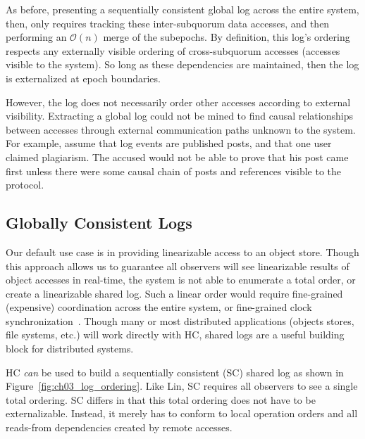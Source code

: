 As before, presenting a sequentially consistent global log across the entire system, then, only requires tracking these inter-subquorum data accesses, and then performing an $\mathcal{O}(n)$ merge of the subepochs.
By definition, this log's ordering respects any externally visible ordering of cross-subquorum accesses (accesses visible to the system).
So long as these dependencies are maintained, then the log is externalized at epoch boundaries.

However, the log does not necessarily order other accesses according to external visibility.
Extracting a global log could not be mined to find causal relationships between accesses through external communication paths unknown to the system.
For example, assume that log events are published posts, and that one user claimed plagiarism.
The accused would not be able to prove that his post came first unless there were some causal chain of posts and references visible to the protocol.

\subsection{Globally Consistent Logs}
\label{sec:ch03_log_ordering}

Our default use case is in providing linearizable access to an object store.
Though this approach allows us to guarantee all observers will see linearizable results of object accesses in real-time, the system is not able to enumerate a total order, or create a linearizable shared log.
Such a linear order would require fine-grained (expensive) coordination across the entire system, or fine-grained clock synchronization~\cite{spanner}.
Though many or most distributed applications (objects stores, file systems, etc.) will work directly with HC, shared logs are a useful building block for distributed systems.

HC \emph{can} be used to build a sequentially consistent (SC) shared log as shown in Figure~\ref{fig:ch03_log_ordering}.
Like Lin, SC requires all observers to see a single total ordering.
SC differs in that this total ordering does not have to be externalizable.
Instead, it merely has to conform to local operation orders and all reads-from dependencies created by remote accesses.

